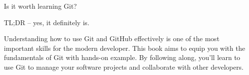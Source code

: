 \noindent Is it worth learning Git? \newline

\noindent TL;DR – yes, it definitely is. \newline

Understanding how to use Git and GitHub effectively is one of the most important skills for the modern developer. This book aims to equip you with the fundamentals of Git with hands-on example. By following along, you'll learn to use Git to manage your software projects and collaborate with other developers.
